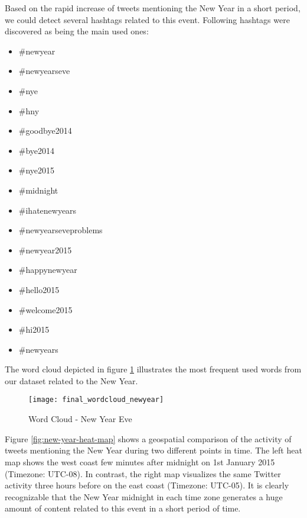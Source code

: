 Based on the rapid increase of tweets mentioning the New Year in a short period, we could detect several hashtags related to this event. Following hashtags were discovered as being the main used ones:
\begin{multicols}{3}
\begin{itemize}[label={}]
  \item \#newyear
  \item \#newyearseve
  \item \#nye
  \item \#hny
  \item \#goodbye2014
  \item \#bye2014
  \item \#nye2015
  \item \#midnight
  \item \#ihatenewyears
  \item \#newyearseveproblems
  \item \#newyear2015
  \item \#happynewyear
  \item \#hello2015
  \item \#welcome2015
  \item \#hi2015
  \item \#newyears
\end{itemize}
\fixspacing
\end{multicols}

The word cloud depicted in figure \ref{fig:new-year-word-cloud} illustrates the most frequent used words from our dataset related to the New Year.

\begin{figure}[H]
  \centering
        \texttt{[image: final\_wordcloud\_newyear]}
  \caption[Word Cloud - New Year Eve]{Word Cloud - New Year Eve}
  \label{fig:new-year-word-cloud}
  \vspace{-1.3em}
\end{figure}

Figure \ref{fig:new-year-heat-map} shows a geospatial comparison of the activity of tweets mentioning the New Year during  two different points in time. The left heat map shows the west coast few minutes after midnight on 1st January 2015 (Timezone: UTC-08). In contrast, the right map visualizes the same Twitter activity three hours before on the east coast (Timezone: UTC-05). It is clearly recognizable that the New Year midnight in each time zone generates a huge amount of content related to this event in a short period of time.

